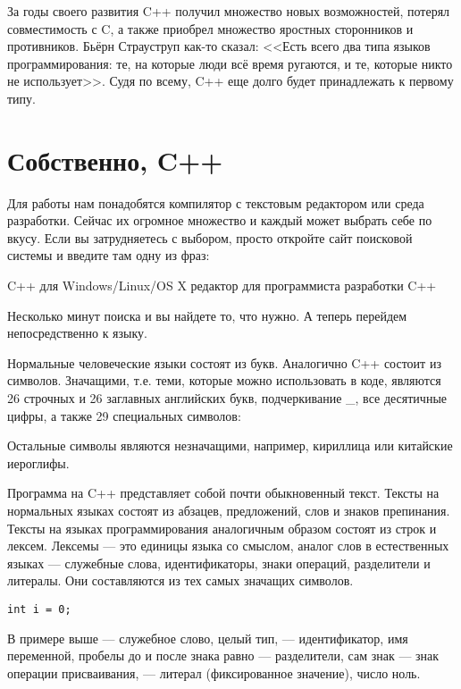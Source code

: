 \documentclass[book.tex]{subfiles}
\begin{document}
За годы своего развития C++ получил множество новых возможностей, потерял совместимость с C, а также приобрел множество яростных сторонников и противников. Бьёрн Страуструп как-то сказал: <<Есть всего два типа языков программирования: те, на которые люди всё время ругаются, и те, которые никто не использует>>. Судя по всему, C++ еще долго будет принадлежать к первому типу.

\section*{Собственно, C++}

Для работы нам понадобятся компилятор с текстовым редактором или среда разработки. Сейчас их огромное множество и каждый может выбрать себе по вкусу. Если вы затрудняетесь с выбором, просто откройте сайт поисковой системы и введите там одну из фраз:

\begin{itemize}
 C++ для Windows/Linux/OS X
 редактор для программиста
 разработки C++
\end{itemize}

Несколько минут поиска и вы найдете то, что нужно. А теперь перейдем непосредственно к языку.

Нормальные человеческие языки состоят из букв. Аналогично C++ состоит из символов. Значащими, т.е. теми, которые можно использовать в коде, являются 26 строчных и 26 заглавных английских букв, подчеркивание \_, все десятичные цифры, а также 29 специальных символов: 


Остальные символы являются незначащими, например, кириллица или китайские иероглифы.

Программа на C++ представляет собой почти обыкновенный текст. Тексты на нормальных языках состоят из абзацев, предложений, слов и знаков препинания. Тексты на языках программирования аналогичным образом состоят из строк и лексем. Лексемы --- это единицы языка со смыслом, аналог слов в естественных языках --- служебные слова, идентификаторы, знаки операций, разделители и литералы. Они составляются из тех самых значащих символов.

\begin{lstlisting}[caption={Пример лексем}, captionpos=b, style=cpp]
int i = 0;
\end{lstlisting}

В примере выше  --- служебное слово, целый тип,  --- идентификатор, имя переменной, пробелы до и после знака равно --- разделители, сам знак \cppword{=} --- знак операции присваивания,  --- литерал (фиксированное значение), число ноль.
\end{document}
